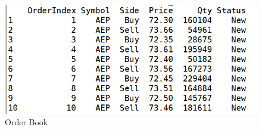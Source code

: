 \begin{figure}[h!]
\centering
\includegraphics[scale=0.8]{client_server/images/orderbook.png}
\caption{Order Book}
\label{fig:order}
\end{figure}
